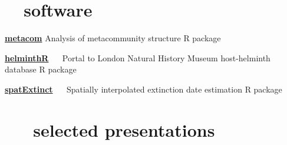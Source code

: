 \documentclass[]{CV}
\begin{document}
\section{\faCode \ \  software}
\begin{entrylist}
 \entry
 {\href{http://cran.r-project.org/web/packages/metacom/}{\textbf{metacom}}}
 {Analysis of metacommunity structure} 
 {R package}

 \entry
 {\href{http://github.com/ropensci/helminthR}{\textbf{helminthR}} \ \ }
 {Portal to London Natural History Museum host-helminth database}
 {R package}

 \entry
 {\href{http://github.com/cjcarlson/spatExtinct}{\textbf{spatExtinct}} \ \ }
 {Spatially interpolated extinction date estimation}
 {R package}

\end{entrylist}





\section{\faVideoCamera \ \ \ selected presentations}
\end{document}
